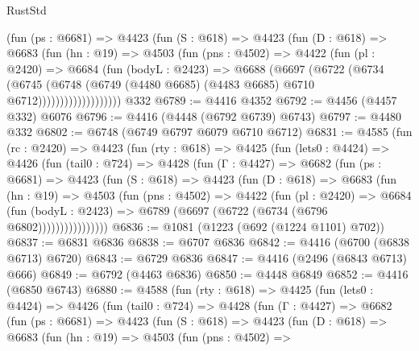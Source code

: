 \begin{lexlean}{RustStd}
\begin{coremodule}
                (fun (ps : @6681) =>
                @4423
                  (fun (S : @618) =>
                  @4423
                    (fun (D : @618) =>
                    @6683
                      (fun (hn : @19) =>
                      @4503
                        (fun (pns : @4502) =>
                        @4422
                          (fun (pl : @2420) =>
                          @6684
                            (fun (bodyL : @2423) =>
                            @6688
                              (@6697
                                (@6722
                                  (@6734
                                    (@6745
                                      (@6748
                                        (@6749
                                          (@4480 @6685)
                                          (@4483 @6685)
                                          @6710
                                          @6712)))))))))))))))))))
    @332
@6789 := @4416 @4352
@6792 := @4456 (@4457 @332) @6076
@6796 := @4416 (@4448 (@6792 @6739) @6743)
@6797 := @4480 @332
@6802 := @6748 (@6749 @6797 @6079 @6710 @6712)
@6831 := @4585
    (fun (rc : @2420) =>
    @4423
      (fun (rty : @618) =>
      @4425
        (fun (lets0 : @4424) =>
        @4426
          (fun (tail0 : @724) =>
          @4428
            (fun (Γ : @4427) =>
            @6682
              (fun (ps : @6681) =>
              @4423
                (fun (S : @618) =>
                @4423
                  (fun (D : @618) =>
                  @6683
                    (fun (hn : @19) =>
                    @4503
                      (fun (pns : @4502) =>
                      @4422
                        (fun (pl : @2420) =>
                        @6684
                          (fun (bodyL : @2423) =>
                          @6789 (@6697 (@6722 (@6734 (@6796 @6802))))))))))))))))
@6836 := @1081 (@1223 (@692 (@1224 @1101) @702))
@6837 := @6831 @6836
@6838 := @6707 @6836
@6842 := @4416 (@6700 (@6838 @6713) @6720)
@6843 := @6729 @6836
@6847 := @4416 (@2496 (@6843 @6713) @666)
@6849 := @6792 (@4463 @6836)
@6850 := @4448 @6849
@6852 := @4416 (@6850 @6743)
@6880 := @4588
    (fun (rty : @618) =>
    @4425
      (fun (lets0 : @4424) =>
      @4426
        (fun (tail0 : @724) =>
        @4428
          (fun (Γ : @4427) =>
          @6682
            (fun (ps : @6681) =>
            @4423
              (fun (S : @618) =>
              @4423
                (fun (D : @618) =>
                @6683
                  (fun (hn : @19) =>
                  @4503
                    (fun (pns : @4502) =>

\end{coremodule}
\end{lexlean}
